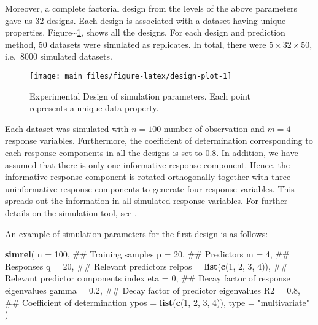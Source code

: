 \documentclass[review]{elsarticle}
\newenvironment{Shaded}{\begin{snugshade}}{\end{snugshade}}
\newcommand{\KeywordTok}[1]{\textcolor[rgb]{0.13,0.29,0.53}{\textbf{#1}}}
\newcommand{\DataTypeTok}[1]{\textcolor[rgb]{0.13,0.29,0.53}{#1}}
\newcommand{\DecValTok}[1]{\textcolor[rgb]{0.00,0.00,0.81}{#1}}
\newcommand{\FloatTok}[1]{\textcolor[rgb]{0.00,0.00,0.81}{#1}}
\newcommand{\StringTok}[1]{\textcolor[rgb]{0.31,0.60,0.02}{#1}}
\newcommand{\NormalTok}[1]{#1}
\providecommand{\tightlist}{%
  \setlength{\itemsep}{0pt}\setlength{\parskip}{0pt}}
\begin{document}
Moreover, a complete factorial design from the levels of the above
parameters gave us 32 designs. Each design is associated with a dataset
having unique properties. Figure\textasciitilde{}\ref{fig:design-plot},
shows all the designs. For each design and prediction method, 50
datasets were simulated as replicates. In total, there were
\(5 \times 32 \times 50\), i.e.~8000 simulated datasets.

\begin{figure}
\texttt{[image: main\_files/figure-latex/design-plot-1]} \caption{Experimental Design of simulation parameters. Each point represents a unique data property.}\label{fig:design-plot}
\end{figure}

\begin{description}
\tightlist
\item[\textbf{Common parameters:}]
Each dataset was simulated with \(n = 100\) number of observation and
\(m = 4\) response variables. Furthermore, the coefficient of
determination corresponding to each response components in all the
designs is set to 0.8. In addition, we have assumed that there is only
one informative response component. Hence, the informative response
component is rotated orthogonally together with three uninformative
response components to generate four response variables. This spreads
out the information in all simulated response variables. For further
details on the simulation tool, see \citep{Rimal2018}.
\end{description}

An example of simulation parameters for the first design is as follows:

\begin{Shaded}
\begin{Highlighting}[]
\KeywordTok{simrel}\NormalTok{(}
    \DataTypeTok{n       =} \DecValTok{100}\NormalTok{,                 ## Training samples}
    \DataTypeTok{p       =} \DecValTok{20}\NormalTok{,                  ## Predictors}
    \DataTypeTok{m       =} \DecValTok{4}\NormalTok{,                   ## Responses}
    \DataTypeTok{q       =} \DecValTok{20}\NormalTok{,                  ## Relevant predictors}
    \DataTypeTok{relpos  =} \KeywordTok{list}\NormalTok{(}\KeywordTok{c}\NormalTok{(}\DecValTok{1}\NormalTok{, }\DecValTok{2}\NormalTok{, }\DecValTok{3}\NormalTok{, }\DecValTok{4}\NormalTok{)), ## Relevant predictor components index}
    \DataTypeTok{eta     =} \DecValTok{0}\NormalTok{,                   ## Decay factor of response eigenvalues}
    \DataTypeTok{gamma   =} \FloatTok{0.2}\NormalTok{,                 ## Decay factor of predictor eigenvalues}
    \DataTypeTok{R2      =} \FloatTok{0.8}\NormalTok{,                 ## Coefficient of determination}
    \DataTypeTok{ypos    =} \KeywordTok{list}\NormalTok{(}\KeywordTok{c}\NormalTok{(}\DecValTok{1}\NormalTok{, }\DecValTok{2}\NormalTok{, }\DecValTok{3}\NormalTok{, }\DecValTok{4}\NormalTok{)),}
    \DataTypeTok{type    =} \StringTok{"multivariate"}
\NormalTok{)}
\end{Highlighting}
\end{Shaded}
\end{document}
